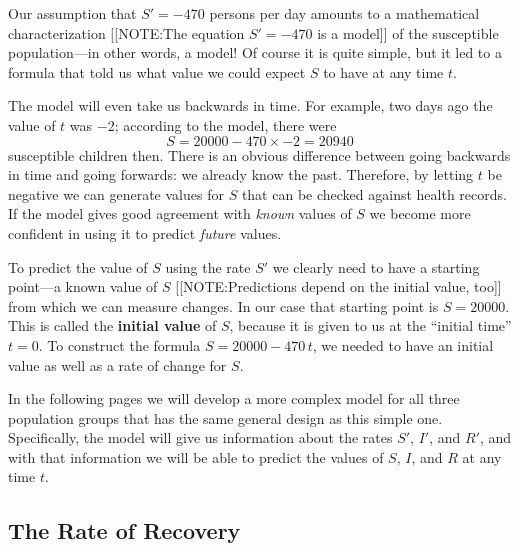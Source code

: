 Our assumption that $S' = -470$ persons per day amounts to a
mathematical characterization
[[NOTE:The equation $S' = -470$   is a model]]
of the susceptible population---in other words, a model!  Of course it
is quite simple, but it led to a formula that told us what value we
could expect $S$ to have at any time $t$.

The model will even take us backwards in time\label{backwards}.  For
example, two days ago the value of $t$ was $-2$; according to the
model, there were
\[
S = 20000 - 470 \times -2 = 20940
\]
susceptible children then.  There is an obvious difference between
going backwards in time and going forwards: we already know the past.
Therefore, by letting $t$ be negative we can generate values for $S$
that can be checked against health records.  If the model gives good
agreement with {\em known\/} values of $S$ we become more confident in
using it to predict {\em future\/} values.

To predict the value of $S$ using the rate $S'$ we clearly need to
have a starting point---a known value of $S$
[[NOTE:Predictions depend on the initial value, too]]
from which we can measure changes.  In our case that starting point is
$S = 20000$.  This is called the {\bf initial value} 
of $S$, because it is given to us at the ``initial time'' $t
= 0$.  To construct the formula $S = 20000 - 470\,t$, we needed to
have an initial value as well as a rate of change for $S$.



In the following pages we will develop a more complex model for all
three population groups that has the same general design as this
simple one.  Specifically, the model will give us information about
the rates $S'$, $I'$, and $R'$, and with that information we will be
able to predict the values of $S$, $I$, and $R$ at any time
$t$\label{`modelend'}.


\subsection{The Rate of Recovery}
\label{subsec:the-rate-of-recovery}

